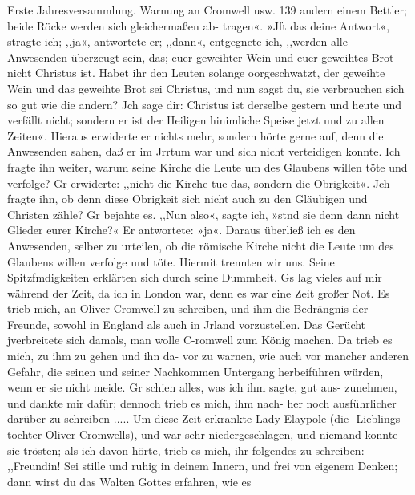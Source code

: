 Erste Jahresversammlung. Warnung an Cromwell usw. 139
andern einem Bettler; beide Röcke werden sich gleichermaßen ab-
tragen«. »Jft das deine Antwort«, stragte ich; ,,ja«, antwortete
er; ,,dann«, entgegnete ich, ,,werden alle Anwesenden überzeugt
sein, das; euer geweihter Wein und euer geweihtes Brot nicht
Christus ist. Habet ihr den Leuten solange oorgeschwatzt, der
geweihte Wein und das geweihte Brot sei Christus, und nun
sagst du, sie verbrauchen sich so gut wie die andern? Jch sage
dir: Christus ist derselbe gestern und heute und verfällt nicht;
sondern er ist der Heiligen hinimliche Speise jetzt und zu allen
Zeiten«. Hieraus erwiderte er nichts mehr, sondern hörte gerne
auf, denn die Anwesenden sahen, daß er im Jrrtum war und sich
nicht verteidigen konnte. Ich fragte ihn weiter, warum seine
Kirche die Leute um des Glaubens willen töte und verfolge?
Gr erwiderte: ,,nicht die Kirche tue das, sondern die Obrigkeit«.
Jch fragte ihn, ob denn diese Obrigkeit sich nicht auch zu den
Gläubigen und Christen zähle? Gr bejahte es. ,,Nun also«,
sagte ich, »stnd sie denn dann nicht Glieder eurer Kirche?« Er
antwortete: »ja«. Daraus überließ ich es den Anwesenden, selber
zu urteilen, ob die römische Kirche nicht die Leute um des Glaubens
willen verfolge und töte. Hiermit trennten wir uns. Seine
Spitzfmdigkeiten erklärten sich durch seine Dummheit.
Gs lag vieles auf mir während der Zeit, da ich in London
war, denn es war eine Zeit großer Not. Es trieb mich, an
Oliver Cromwell zu schreiben, und ihm die Bedrängnis der
Freunde, sowohl in England als auch in Jrland vorzustellen.
Das Gerücht jverbreitete sich damals, man wolle C-romwell zum
König machen. Da trieb es mich, zu ihm zu gehen und ihn da-
vor zu warnen, wie auch vor mancher anderen Gefahr, die seinen
und seiner Nachkommen Untergang herbeiführen würden, wenn
er sie nicht meide. Gr schien alles, was ich ihm sagte, gut aus-
zunehmen, und dankte mir dafür; dennoch trieb es mich, ihm nach-
her noch ausführlicher darüber zu schreiben .....
Um diese Zeit erkrankte Lady Elaypole (die -Lieblings-tochter
Oliver Cromwells), und war sehr niedergeschlagen, und niemand
konnte sie trösten; als ich davon hörte, trieb es mich, ihr folgendes
zu schreiben: —
,,Freundin!
Sei stille und ruhig in deinem Innern, und frei von eigenem
Denken; dann wirst du das Walten Gottes erfahren, wie es

